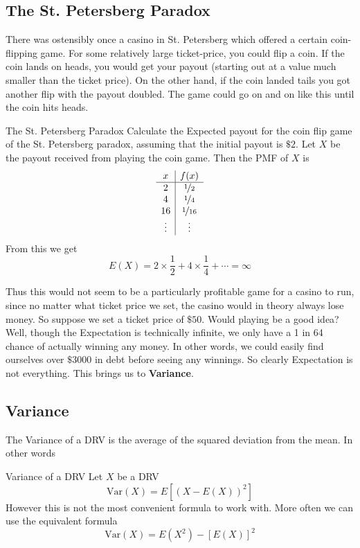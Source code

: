 \documentclass{report}
\begin{document}
\subsection{The St. Petersberg Paradox}
There was ostensibly once a casino in St. Petersberg which offered a certain coin-flipping game. For some relatively large ticket-price, you could flip a coin. If the coin lands on heads, you would get your payout (starting out at a value much smaller than the ticket price). On the other hand, if the coin landed tails you got another flip with the payout doubled. The game could go on and on like this until the coin hits heads.
\begin{example}{The St. Petersberg Paradox}
    Calculate the Expected payout for the coin flip game of the St. Petersberg paradox, assuming that the initial payout is $\$2$.
\tcblower
    Let $X$ be the payout received from playing the coin game. Then the PMF of $X$ is
    \[
        \begin{array}{c|c}
             x & f(x) \\
             \hline
             2 & \nicefrac 12 \\
             4 & \nicefrac 14 \\
             16 & \nicefrac 1{16} \\
             \vdots & \vdots
        \end{array}
    \]
    From this we get
    \[
        E(X) = 2\times \frac 12 + 4 \times \frac 1 4 + \cdots = \infty
    \]
\end{example}
Thus this would not seem to be a particularly profitable game for a casino to run, since no matter what ticket price we set, the casino would in theory always lose money. So suppose we set a ticket price of $\$50$. Would playing be a good idea? Well, though the Expectation is technically infinite, we only have a 1 in 64 chance of actually winning any money. In other words, we could easily find ourselves over $\$3000$ in debt before seeing any winnings.  So clearly Expectation is not everything. This brings us to \textbf{Variance}.

\subsection{Variance}
\newcommand{\Var}{\text{Var}}
The Variance of a DRV is the average of the squared deviation from the mean. In other words
\begin{definition}{Variance of a DRV}
    Let $X$ be a DRV 
    \[
        \Var(X)=E[(X-E(X))^2]   
    \]
    However this is not the most convenient formula to work with. More often we can use the equivalent formula
    \[
        \Var(X)=E(X^2)-[E(X)]^2
    \]
\end{definition}
\end{document}
